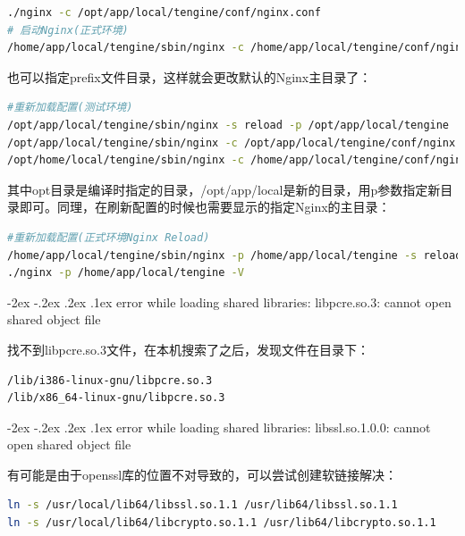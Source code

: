 \documentclass[12pt]{book}
\makeatletter
\numberwithin{dummy}{section}
\theoremstyle{ocrenumbox}
\theoremstyle{blacknumex}
\theoremstyle{blacknumbox}
\theoremstyle{ocrenum}
\renewcommand\paragraph{\@startsection{paragraph}{4}{\z@}
	{-2ex \@plus-.2ex \@minus .2ex}
	{.1ex}
	{\normalfont\small\sffamily\bfseries}}
\makeatother
\begin{document}
\begin{lstlisting}[language=bash]
./nginx -c /opt/app/local/tengine/conf/nginx.conf
# 启动Nginx(正式环境)
/home/app/local/tengine/sbin/nginx -c /home/app/local/tengine/conf/nginx.conf -p /home/app/local/tengine
\end{lstlisting}

也可以指定prefix文件目录，这样就会更改默认的Nginx主目录了：

\begin{lstlisting}[language=bash]
#重新加载配置(测试环境)
/opt/app/local/tengine/sbin/nginx -s reload -p /opt/app/local/tengine
/opt/app/local/tengine/sbin/nginx -c /opt/app/local/tengine/conf/nginx.conf -p /opt/app/local/tengine
/opt/home/local/tengine/sbin/nginx -c /home/app/local/tengine/conf/nginx.conf -p /home/app/local/tengine
\end{lstlisting}

其中opt目录是编译时指定的目录，/opt/app/local是新的目录，用p参数指定新目录即可。同理，在刷新配置的时候也需要显示的指定Nginx的主目录：

\begin{lstlisting}[language=bash]
#重新加载配置(正式环境Nginx Reload)
/home/app/local/tengine/sbin/nginx -p /home/app/local/tengine -s reload
./nginx -p /home/app/local/tengine -V
\end{lstlisting}

\paragraph{error while loading shared libraries: libpcre.so.3: cannot open shared object file}

找不到libpcre.so.3文件，在本机搜索了之后，发现文件在目录下：

\begin{lstlisting}[language=bash]
/lib/i386-linux-gnu/libpcre.so.3
/lib/x86_64-linux-gnu/libpcre.so.3
\end{lstlisting}

\paragraph{error while loading shared libraries: libssl.so.1.0.0: cannot open shared object file}

有可能是由于openssl库的位置不对导致的，可以尝试创建软链接解决：

\begin{lstlisting}[language=bash]
ln -s /usr/local/lib64/libssl.so.1.1 /usr/lib64/libssl.so.1.1  
ln -s /usr/local/lib64/libcrypto.so.1.1 /usr/lib64/libcrypto.so.1.1  
\end{lstlisting}
\end{document}
